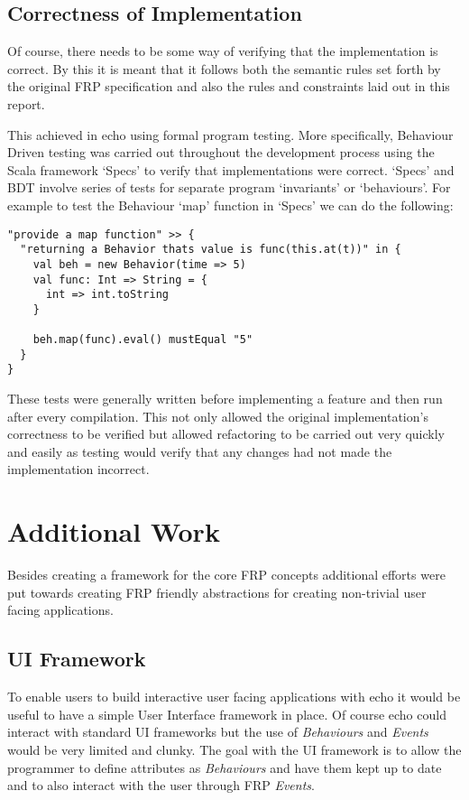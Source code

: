 \documentclass[12pt]{article}
\begin{document}
    
    \subsection{Correctness of Implementation}
      Of course, there needs to be some way of verifying that the implementation is correct. By
      this it is meant that it follows both the semantic rules set forth by the original FRP specification
      and also the rules and constraints laid out in this report.
      
      This achieved in echo using formal program testing. More specifically, Behaviour Driven
      testing was carried out throughout the development process using the Scala framework `Specs'
      to verify that implementations were correct. `Specs' and BDT involve series of tests for
      separate program `invariants' or `behaviours'. For example to test the Behaviour `map' function
      in `Specs' we can do the following:
 
\begin{verbatim}
"provide a map function" >> {
  "returning a Behavior thats value is func(this.at(t))" in {
    val beh = new Behavior(time => 5)
    val func: Int => String = {
      int => int.toString
    }

    beh.map(func).eval() mustEqual "5"
  }
}
\end{verbatim}      

    These tests were generally written before implementing a feature and then run after every compilation. 
    This not only allowed the original implementation's correctness to be verified but
    allowed refactoring to be carried out very quickly and easily as testing would verify that any changes had not
    made the implementation incorrect.
      
  \section{Additional Work}
    Besides creating a framework for the core FRP concepts additional efforts
    were put towards creating FRP friendly abstractions for creating non-trivial user facing
    applications.
    
    \subsection{UI Framework}
      To enable users to build interactive user facing applications with echo it would be useful to have a simple User 
      Interface framework in place. Of course echo could interact with standard UI frameworks but the use of \emph{Behaviours} 
      and \emph{Events} would be very limited and clunky. The goal with the UI framework is to allow the programmer to define 
      attributes as \emph{Behaviours} and have them kept up to date and to also interact with the user through FRP 
      \emph{Events}. 
\end{document}
